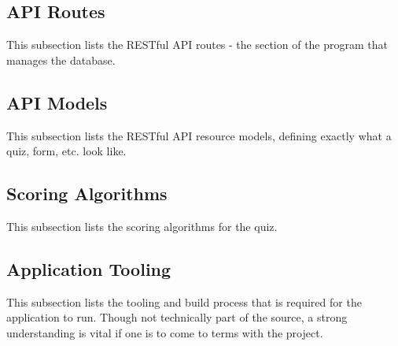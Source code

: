 \subsection{API Routes} %
\label{sub:api_routes}
This subsection lists the RESTful API routes - the section of the program that manages the database.


\subsection{API Models} %
\label{sub:api_models}
This subsection lists the RESTful API resource models, defining exactly what a quiz, form, etc. look like.


\subsection{Scoring Algorithms} %
\label{sub:api_models}
This subsection lists the scoring algorithms for the quiz.


\subsection{Application Tooling} %
\label{sub:api_models}
This subsection lists the tooling and build process that is required for the application to run. Though not technically part of the source, a strong understanding is vital if one is to come to terms with the project.

